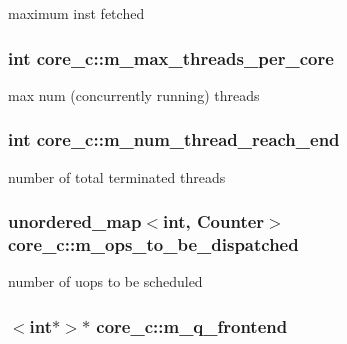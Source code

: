 \label{classcore__c_a8de59f8588f5fb79f027f20e478ec6f3}
maximum inst fetched \hypertarget{classcore__c_af42a23fef776aaac11781e717aabc26d}{
\subsubsection[{m\_\-max\_\-threads\_\-per\_\-core}]{\setlength{\rightskip}{0pt plus 5cm}int {\bf core\_\-c::m\_\-max\_\-threads\_\-per\_\-core}}}
\label{classcore__c_af42a23fef776aaac11781e717aabc26d}
max num (concurrently running) threads \hypertarget{classcore__c_abe6acae404f632cae581831f581a3a93}{
\subsubsection[{m\_\-num\_\-thread\_\-reach\_\-end}]{\setlength{\rightskip}{0pt plus 5cm}int {\bf core\_\-c::m\_\-num\_\-thread\_\-reach\_\-end}}}
\label{classcore__c_abe6acae404f632cae581831f581a3a93}
number of total terminated threads \hypertarget{classcore__c_ad808d2cc32a42c817db163990b008369}{
\subsubsection[{m\_\-ops\_\-to\_\-be\_\-dispatched}]{\setlength{\rightskip}{0pt plus 5cm}unordered\_\-map$<$int, Counter$>$ {\bf core\_\-c::m\_\-ops\_\-to\_\-be\_\-dispatched}}}
\label{classcore__c_ad808d2cc32a42c817db163990b008369}
number of uops to be scheduled \hypertarget{classcore__c_a0f31904381b06495a98b272fff7e7ac6}{
\subsubsection[{m\_\-q\_\-frontend}]{$<$int$\ast$$>$$\ast$ {\bf core\_\-c::m\_\-q\_\-frontend}}}
